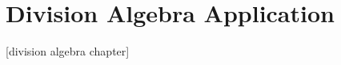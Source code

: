 \documentclass[../sean_thesis.tex]{subfiles}
\begin{document}
\chapter{Division Algebra Application}

[division algebra chapter]
\end{document}
